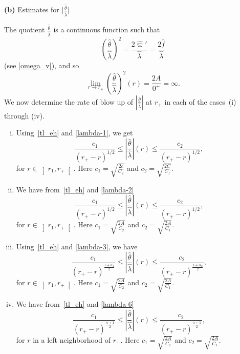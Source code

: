 \documentclass[a4paper,11pt,oneside,reqno]{amsart}
\begin{document}
\bigskip


\begin{center}
{\bf (b)} Estimates for $\bigl|\frac{\hat{\theta}}{\hat{\lambda}}\bigr|$
\end{center}

The quotient $\frac{\hat\theta}{\hat\lambda}$ 
is a continuous function such that
\begin{equation}\label{tl_eh}
\left(\frac{\hat\theta}{\hat\lambda}\right)^2=\frac{2\hat\varpi'}{\hat{\lambda}}=\frac{2\hat f}{\hat{\lambda}}
\end{equation}
(see \eqref{omega_v}), and so 
$$
\lim_{r\to r_+}\left(\frac{\hat\theta}{\hat\lambda}\right)^2(r)=\frac{2A}{0^+}=\infty.
$$
We now determine the rate of blow up of $\left|\frac{\hat\theta}{\hat\lambda}\right|$ at $r_+$ in each of the cases~(i) through (iv).



\begin{enumerate}[(i)]
\item 
Using~\eqref{tl_eh} and \eqref{lambda-1}, we get
$$
\frac{c_1}{(r_+-r)^{1/2}}\leq
\left|\frac{\hat\theta}{\hat\lambda}\right|(r)\leq
\frac{c_2}{(r_+-r)^{1/2}},
$$
for $r \in \left]r_1,r_+\right[$. Here
$c_1=\sqrt{\frac{2c}{C_2}}$ and $c_2=\sqrt{\frac{2C}{C_1}}$.
\item 
We have from~\eqref{tl_eh} and \eqref{lambda-2}
$$
\frac{c_1}{(r_+-r)^{1/2}}\leq
\left|\frac{\hat\theta}{\hat\lambda}\right|(r)
\leq\frac{c_2}{(r_+-r)^{1/2}},
$$
for $r \in \left]r_1,r_+\right[$. 
Here $c_1=\sqrt{\frac{2A}{C_2}}$ and $c_2=\sqrt{\frac{2A}{C_1}}$.
\item Using~\eqref{tl_eh} and \eqref{lambda-3},
we have
$$
\frac{c_1}{(r_+-r)^{\frac{1+\alpha_1}2}}
\leq\left|\frac{\hat\theta}{\hat\lambda}\right|(r)\leq
\frac{c_2}{(r_+-r)^{\frac{1+\alpha_2}2}},
$$
for $r \in \left]r_1,r_+\right[$. 
Here $c_1=\sqrt{\frac{2A}{C_2}}$ and $c_2=\sqrt{\frac{2A}{C_1}}$.
\item We have from~\eqref{tl_eh} and \eqref{lambda-6}
$$
\frac{c_1}{(r_+-r)^{\frac{n+1}2}}
\leq\left|\frac{\hat\theta}{\hat\lambda}\right|(r)\leq
\frac{c_2}{(r_+-r)^{\frac{n+1}2}},
$$
for $r$ in a left neighborhood of $r_+$. 
Here $c_1=\sqrt{\frac{2A}{C_2}}$ and $c_2=\sqrt{\frac{2A}{C_1}}$.
\end{enumerate}

\bigskip
\end{document}
